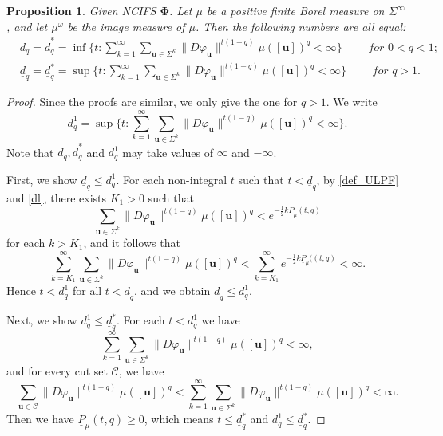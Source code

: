 \documentclass[12pt]{amsart}
\theoremstyle{plain}
\newtheorem{prop}[thm]{Proposition}
\theoremstyle{definition}
\theoremstyle{remark}
\newcommand{\bu}{\mathbf{u}}
\begin{document}
\begin{prop}\label{cut to qici}
Given NCIFS $\boldsymbol{\Phi}$.  Let $\mu$ be a positive finite Borel  measure on $\Sigma^\infty$, and let $\mu^\omega$ be the image measure of $\mu$. Then the following numbers  are all equal:
\[\begin{split}
&\overline{d}_q= \overline{d}_q^*=\inf\{t:\sum_{k=1}^\infty\sum_{\mathbf{u}\in\Sigma^k}\|D\varphi_\mathbf{u}\|^{t(1-q)}\mu([\bu])^q<\infty\} \qquad \textit{ for $0<q<1$} ; \\
&\underline{d}_q= \underline{d}_q^*=\sup\{t:\sum_{k=1}^\infty\sum_{\mathbf{u}\in\Sigma^k}\|D\varphi_\mathbf{u}\|^{t(1-q)}\mu([\bu])^q<\infty\} \qquad \textit{ for $q>1$}.
\end{split}
\]
\end{prop}


\begin{proof}
Since the proofs are similar, we only give the one for $q>1$. We write 
$$
d_q^1=\sup\{t:\sum_{k=1}^\infty\sum_{\mathbf{u}\in\Sigma^k}\|D\varphi_\mathbf{u}\|^{t(1-q)}\mu([\bu])^q<\infty\}.
$$
Note that $\overline{d}_q, \overline{d}_q^*$ and $d_q^1$ may take values of  $\infty$ and $-\infty$. 


First, we show $\underline{d}_q\leq d_q^1 $.  For each non-integral $t$ such that $t<\underline{d}_q $, by \eqref{def_ULPF} and \eqref{dl}, there exists  $K_1>0$ such that
$$
\sum_{\mathbf{u}\in\Sigma^k}\|D\varphi_\mathbf{u}\|^{t(1-q)}\mu([\bu])^q<e^{-\frac{1}{2}k\underline{P}_\mu(t,q)}
$$
for each $k>K_1$, and it follows that 
$$
\sum_{k=K_1}^\infty\sum_{\mathbf{u}\in\Sigma^k}\|D\varphi_\mathbf{u}\|^{t(1-q)}\mu([\bu])^q<\sum_{k=K_1}^\infty e^{-\frac{1}{2}k\underline{P}_\mu((t,q)}<\infty.
$$
Hence  $t<d_q^1$ for all $t<\underline{d}_q $, and we obtain $\underline{d}_q\leq d_q^1 $. 



Next, we show $d_q^1\leq \underline{d}_q^*$. For each $t<d_q^1$ we have
$$
\sum_{k=1}^\infty\sum_{\mathbf{u}\in\Sigma^k}\|D\varphi_\mathbf{u}\|^{t(1-q)}\mu([\bu])^q<\infty,
$$
and for every cut set $\mathcal{C}$, we have
$$
\sum_{\mathbf{u}\in\mathcal{C}}\|D\varphi_\mathbf{u}\|^{t(1-q)}\mu([\bu])^q<\sum_{k=1}^\infty\sum_{\mathbf{u}\in\Sigma^k}\|D\varphi_\mathbf{u}\|^{t(1-q)}\mu([\bu])^q<\infty.
$$
Then we have $\underline P_\mu(t, q)\ge 0$, which means $t\le \underline{d}_q^*$ and $d_q^1\leq \underline{d}_q^*$.


\end{proof}
\end{document}
